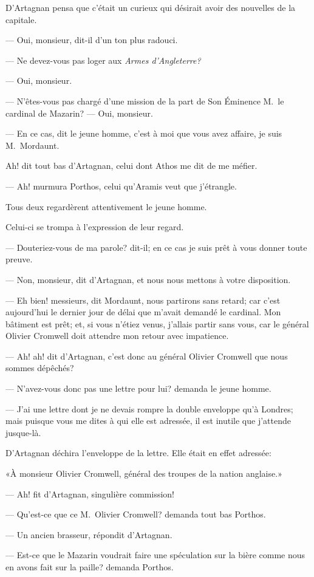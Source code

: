 D'Artagnan pensa que c'était un curieux qui désirait avoir des nouvelles de la capitale.

— Oui, monsieur, dit-il d'un ton plus radouci.

— Ne devez-vous pas loger aux \textit{Armes d'Angleterre?}

— Oui, monsieur.

— N'êtes-vous pas chargé d'une mission de la part de Son Éminence M.~le cardinal de Mazarin?
— Oui, monsieur.

— En ce cas, dit le jeune homme, c'est à moi que vous avez affaire, je suis M.~Mordaunt.

Ah! dit tout bas d'Artagnan, celui dont Athos me dit de me méfier.

— Ah! murmura Porthos, celui qu'Aramis veut que j'étrangle.

Tous deux regardèrent attentivement le jeune homme.

Celui-ci se trompa à l'expression de leur regard.

— Douteriez-vous de ma parole? dit-il; en ce cas je suis prêt à vous donner toute preuve.

— Non, monsieur, dit d'Artagnan, et nous nous mettons à votre disposition.

— Eh bien! messieurs, dit Mordaunt, nous partirons sans retard; car c'est aujourd'hui le dernier jour de délai que m'avait demandé le cardinal. Mon bâtiment est prêt; et, si vous n'étiez venus, j'allais partir sans vous, car le général Olivier Cromwell doit attendre mon retour avec impatience.

— Ah! ah! dit d'Artagnan, c'est donc au général Olivier Cromwell que nous sommes dépêchés?

— N'avez-vous donc pas une lettre pour lui? demanda le jeune homme.

— J'ai une lettre dont je ne devais rompre la double enveloppe qu'à Londres; mais puisque vous me dites à qui elle est adressée, il est inutile que j'attende jusque-là.

D'Artagnan déchira l'enveloppe de la lettre. Elle était en effet adressée:

«À monsieur Olivier Cromwell, général des troupes de la nation anglaise.»

— Ah! fit d'Artagnan, singulière commission!

— Qu'est-ce que ce M.~Olivier Cromwell? demanda tout bas Porthos.

— Un ancien brasseur, répondit d'Artagnan.

— Est-ce que le Mazarin voudrait faire une spéculation sur la bière comme nous en avons fait sur la paille? demanda Porthos.

